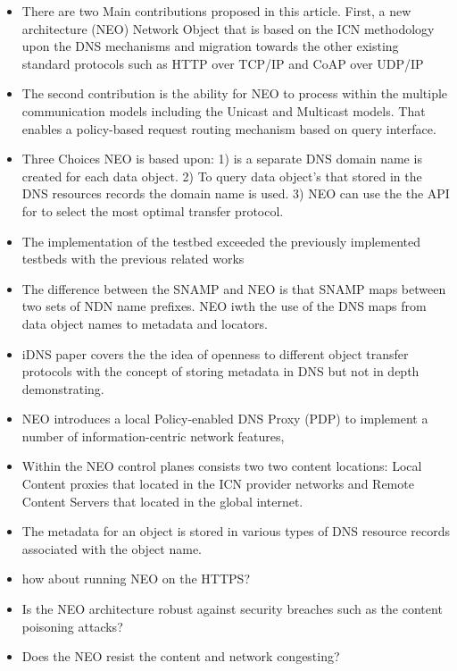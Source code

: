 \documentclass{article}
\begin{document}
\begin{itemize}
    \item There are two Main contributions proposed in this article. First, a new architecture (NEO) Network Object that is based on the ICN methodology upon the DNS mechanisms and migration towards the other existing standard protocols such as HTTP over TCP/IP and CoAP over UDP/IP 
    \item The second contribution is the ability for NEO to process within the multiple communication models including the Unicast and Multicast models. That enables a policy-based request routing mechanism based on query interface.   
    \item Three Choices NEO is based upon: 1) is a separate DNS domain name is created for each data object. 2) To query data object's that stored in the DNS resources records the domain name is used. 3)  NEO can use the the API for to select the most optimal transfer protocol. 
    \item The implementation of the testbed exceeded the previously implemented testbeds with the previous related works
    \item The difference between the SNAMP and NEO is that SNAMP maps between two sets of NDN name prefixes. NEO iwth the use of the DNS maps from data object names to metadata and locators. 
    \item iDNS paper covers the the idea of openness to different object transfer protocols with the concept of storing metadata in DNS but not in depth demonstrating. 
    \item NEO introduces a local Policy-enabled DNS Proxy (PDP) to implement a number of information-centric network features,
    \item Within the NEO control planes consists two two content locations: Local Content proxies that located in the ICN provider networks and Remote Content Servers that located in the global internet. 
    \item The metadata for an object is stored in various types of DNS resource records associated with the object name.
    \item how about running NEO on the HTTPS? 
    \item Is the NEO architecture robust against security breaches such as the content poisoning  attacks? \item Does the NEO resist the content and network congesting?
    
  
    
    

    
    
\end{itemize}

	\clearpage
	
	

	
\end{document}
